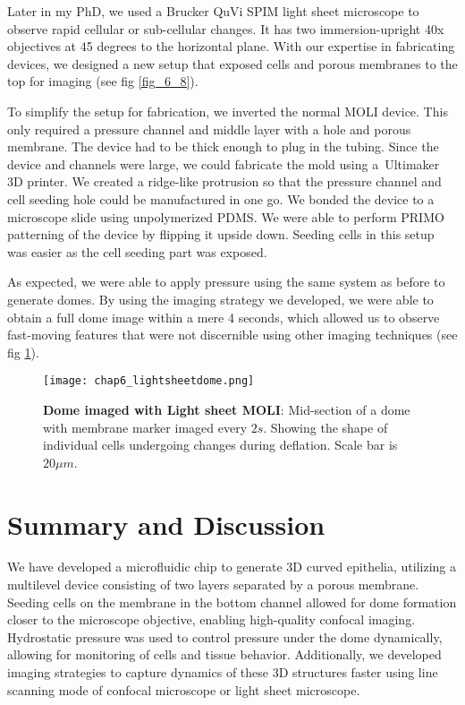 Later in my PhD, we used a Brucker QuVi SPIM light sheet microscope to observe rapid cellular or sub-cellular changes. It has two immersion-upright 40x objectives at 45 degrees to the horizontal plane. With our expertise in fabricating devices, we designed a new setup that exposed cells and porous membranes to the top for imaging (see fig \ref{fig_6_8}).

To simplify the setup for fabrication, we inverted the normal MOLI device. This only required a pressure channel and middle layer with a hole and porous membrane. The device had to be thick enough to plug in the tubing. Since the device and channels were large, we could fabricate the mold using a Ultimaker 3D printer. We created a ridge-like protrusion so that the pressure channel and cell seeding hole could be manufactured in one go. We bonded the device to a microscope slide using unpolymerized PDMS. We were able to perform PRIMO patterning of the device by flipping it upside down. Seeding cells in this setup was easier as the cell seeding part was exposed.

As expected, we were able to apply pressure using the same system as before to generate domes. By using the imaging strategy we developed, we were able to obtain a full dome image within a mere 4 seconds, which allowed us to observe fast-moving features that were not discernible using other imaging techniques (see fig \ref{fig_6_9}).

\begin{figure}[h]
	\centering
	\texttt{[image: chap6\_lightsheetdome.png]}
	\caption{ \textbf{Dome imaged with Light sheet MOLI}: Mid-section of a dome with membrane marker imaged every $2s$. Showing the shape of individual cells undergoing changes during deflation. Scale bar is $20 \mu m$.
	}\label{fig_6_9}
\end{figure}

\newpage
\hypertarget{summary-and-discussion}{%
\section{Summary and Discussion}\label{summary-and-discussion}}

We have developed a microfluidic chip to generate 3D curved epithelia, utilizing a multilevel device consisting of two layers separated by a porous membrane. Seeding cells on the membrane in the bottom channel allowed for dome formation closer to the microscope objective, enabling high-quality confocal imaging. Hydrostatic pressure was used to control pressure under the dome dynamically, allowing for monitoring of cells and tissue behavior. Additionally, we developed imaging strategies to capture dynamics of these 3D structures faster using line scanning mode of confocal microscope or light sheet microscope.  


